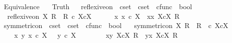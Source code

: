 %
\begin{isabellebody}%
%
%
\isadelimdocument
%
\endisadelimdocument
%
\isatagdocument
%
\isamarkuptrue%
%
\endisatagdocument
{\isafolddocument}%
%
\isadelimdocument
%
\endisadelimdocument
%
\isadelimtheory
%
\endisadelimtheory
%
\isatagtheory
{}\isamarkupfalse%
\ Equivalence\isanewline
\ \ \ Truth\isanewline
{}%
\endisatagtheory
{\isafoldtheory}%
%
\isadelimtheory
\isanewline
%
\endisadelimtheory
\ \isanewline
{}\isamarkupfalse%
\ reflexive{\isacharunderscore}{\kern0pt}on\ {\isacharcolon}{\kern0pt}{\isacharcolon}{\kern0pt}\ {\isachardoublequoteopen}cset\ {\isasymRightarrow}\ cset\ {\isasymtimes}\ cfunc\ {\isasymRightarrow}\ bool{\isachardoublequoteclose}\ \isanewline
\ \ {\isachardoublequoteopen}reflexive{\isacharunderscore}{\kern0pt}on\ X\ R\ {\isacharequal}{\kern0pt}\ {\isacharparenleft}{\kern0pt}R\ {\isasymsubseteq}\isactrlsub c\ X{\isasymtimes}\isactrlsub cX\ {\isasymand}\ \isanewline
\ \ \ \ {\isacharparenleft}{\kern0pt}{\isasymforall}x{\isachardot}{\kern0pt}\ x\ {\isasymin}\isactrlsub c\ X\ {\isasymlongrightarrow}\ {\isacharparenleft}{\kern0pt}{\isasymlangle}x{\isacharcomma}{\kern0pt}x{\isasymrangle}\ {\isasymin}\isactrlbsub X{\isasymtimes}\isactrlsub cX\isactrlesub \ R{\isacharparenright}{\kern0pt}{\isacharparenright}{\kern0pt}{\isacharparenright}{\kern0pt}{\isachardoublequoteclose}\isanewline
\isanewline
{}\isamarkupfalse%
\ symmetric{\isacharunderscore}{\kern0pt}on\ {\isacharcolon}{\kern0pt}{\isacharcolon}{\kern0pt}\ {\isachardoublequoteopen}cset\ {\isasymRightarrow}\ cset\ {\isasymtimes}\ cfunc\ {\isasymRightarrow}\ bool{\isachardoublequoteclose}\ \isanewline
\ \ {\isachardoublequoteopen}symmetric{\isacharunderscore}{\kern0pt}on\ X\ R\ {\isacharequal}{\kern0pt}\ {\isacharparenleft}{\kern0pt}R\ \ {\isasymsubseteq}\isactrlsub c\ X{\isasymtimes}\isactrlsub cX\ {\isasymand}\isanewline
\ \ \ \ {\isacharparenleft}{\kern0pt}{\isasymforall}x\ y{\isachardot}{\kern0pt}\ x\ {\isasymin}\isactrlsub c\ X\ {\isasymand}\ \ y\ {\isasymin}\isactrlsub c\ X\ {\isasymlongrightarrow}\ \isanewline
\ \ \ \ \ \ {\isacharparenleft}{\kern0pt}{\isasymlangle}x{\isacharcomma}{\kern0pt}y{\isasymrangle}\ {\isasymin}\isactrlbsub X{\isasymtimes}\isactrlsub cX\isactrlesub \ R\ {\isasymlongrightarrow}\ {\isasymlangle}y{\isacharcomma}{\kern0pt}x{\isasymrangle}\ {\isasymin}\isactrlbsub X{\isasymtimes}\isactrlsub cX\isactrlesub \ R{\isacharparenright}{\kern0pt}{\isacharparenright}{\kern0pt}{\isacharparenright}{\kern0pt}{\isachardoublequoteclose}\ \isanewline

\end{isabellebody}
